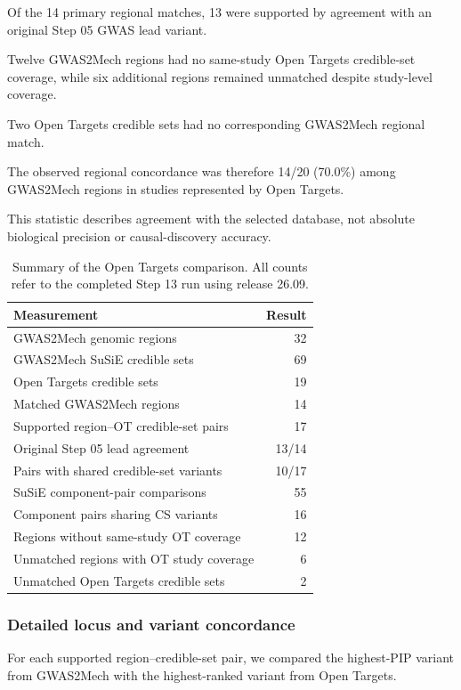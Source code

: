 \documentclass[11pt,a4paper]{article}
\begin{document}
Of the 14 primary regional matches, 13 were
supported by agreement with an original Step 05
GWAS lead variant.

Twelve GWAS2Mech regions had no same-study
Open Targets credible-set coverage, while
six additional regions remained unmatched
despite study-level coverage.

Two Open Targets credible sets had no corresponding
GWAS2Mech regional match.

The observed regional concordance was therefore
14/20 (70.0\%) among GWAS2Mech regions in
studies represented by Open Targets.

This statistic describes agreement with the
selected database, not absolute biological
precision or causal-discovery accuracy.

\begin{table}[htbp]
\centering
\caption{Summary of the Open Targets comparison.
All counts refer to the completed Step 13 run
using release 26.09.}
\label{tab:step13_summary}
\small
\begin{tabular}{@{}lr@{}}
\toprule
Measurement & Result \\
\midrule
GWAS2Mech genomic regions & 32 \\
GWAS2Mech SuSiE credible sets & 69 \\
Open Targets credible sets & 19 \\
Matched GWAS2Mech regions & 14 \\
Supported region--OT credible-set pairs & 17 \\
Original Step 05 lead agreement & 13/14 \\
Pairs with shared credible-set variants & 10/17 \\
SuSiE component-pair comparisons & 55 \\
Component pairs sharing CS variants & 16 \\
Regions without same-study OT coverage & 12 \\
Unmatched regions with OT study coverage & 6 \\
Unmatched Open Targets credible sets & 2 \\
\bottomrule
\end{tabular}
\end{table}


\subsubsection{Detailed locus and variant concordance}

For each supported region--credible-set pair,
we compared the highest-PIP variant from
GWAS2Mech with the highest-ranked variant
from Open Targets.
\end{document}
